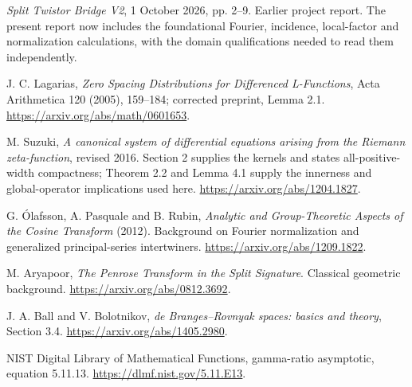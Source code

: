 \documentclass[11pt,letterpaper]{article}
\begin{document}
\begin{enumerate}[label={[\arabic*]}]
\item \emph{Split Twistor Bridge V2}, 1 October 2026, pp. 2--9. Earlier project report. The present report now includes the foundational Fourier, incidence, local-factor and normalization calculations, with the domain qualifications needed to read them independently.
\item J. C. Lagarias, \emph{Zero Spacing Distributions for Differenced L-Functions}, Acta Arithmetica 120 (2005), 159--184; corrected preprint, Lemma 2.1. \url{https://arxiv.org/abs/math/0601653}.
\item M. Suzuki, \emph{A canonical system of differential equations arising from the Riemann zeta-function}, revised 2016. Section 2 supplies the kernels and states all-positive-width compactness; Theorem 2.2 and Lemma 4.1 supply the innerness and global-operator implications used here. \url{https://arxiv.org/abs/1204.1827}.
\item G. \'Olafsson, A. Pasquale and B. Rubin, \emph{Analytic and Group-Theoretic Aspects of the Cosine Transform} (2012). Background on Fourier normalization and generalized principal-series intertwiners. \url{https://arxiv.org/abs/1209.1822}.
\item M. Aryapoor, \emph{The Penrose Transform in the Split Signature}. Classical geometric background. \url{https://arxiv.org/abs/0812.3692}.
\item J. A. Ball and V. Bolotnikov, \emph{de Branges--Rovnyak spaces: basics and theory}, Section 3.4. \url{https://arxiv.org/abs/1405.2980}.
\item NIST Digital Library of Mathematical Functions, gamma-ratio asymptotic, equation 5.11.13. \url{https://dlmf.nist.gov/5.11.E13}.
\end{enumerate}
\end{document}
